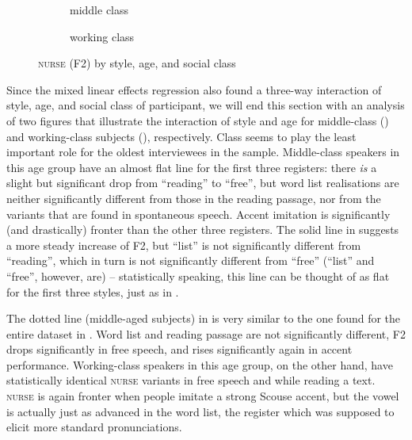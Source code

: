 \begin{figure}
	
	\begin{subfigure}{.49\textwidth}
		
			\resizebox{\linewidth}{!}{} 
		\caption{middle class}
		\label{fig.line.f2.nurse.mc}
	\end{subfigure}
	\begin{subfigure}{.49\textwidth}
		
			\resizebox{\linewidth}{!}{} 
		\caption{working class}
		\label{fig.line.f2.nurse.wc}
	\end{subfigure}
	\caption{\textsc{nurse} (F2) by style, age, and social class}
\end{figure}

Since the mixed linear effects regression also found a three-way interaction of style, age, and social class of participant, we will end this section with an analysis of two figures that illustrate the interaction of style and age for middle-class () and working-class subjects (), respectively.
Class seems to play the least important role for the oldest interviewees in the sample.
Middle-class speakers in this age group have an almost flat line for the first three registers: there \emph{is} a slight but significant drop from ``reading'' to ``free'', but word list realisations are neither significantly different from those in the reading passage, nor from the variants that are found in spontaneous speech.
Accent imitation is significantly (and drastically) fronter than the other three registers.
The solid line in  suggests a more steady increase of F2, but ``list'' is not significantly different from ``reading'', which in turn is not significantly different from ``free'' (``list'' and ``free'', however, are) -- statistically speaking, this line can be thought of as flat for the first three styles, just as in .

The dotted line (middle-aged subjects) in  is very similar to the one found for the entire dataset in .
Word list and reading passage are not significantly different, F2 drops significantly in free speech, and rises significantly again in accent performance.
Working-class speakers in this age group, on the other hand, have statistically identical \textsc{nurse} variants in free speech and while reading a text.
\textsc{nurse} is again fronter when people imitate a strong Scouse accent, but the vowel is actually just as advanced in the word list, the register which was supposed to elicit more standard pronunciations.


